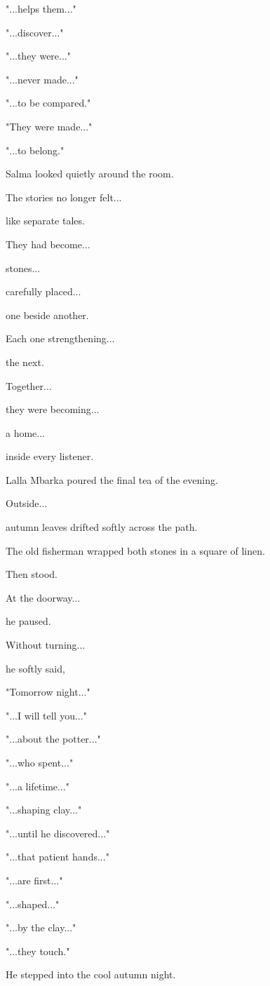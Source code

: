 \documentclass[12pt,openany]{book}
\begin{document}
"...helps them..."

"...discover..."

"...they were..."

"...never made..."

"...to be compared."

"They were made..."

"...to belong."

Salma looked quietly around the room.

The stories no longer felt...

like separate tales.

They had become...

stones...

carefully placed...

one beside another.

Each one strengthening...

the next.

Together...

they were becoming...

a home...

inside every listener.

Lalla Mbarka poured the final tea of the evening.

Outside...

autumn leaves drifted softly across the path.

The old fisherman wrapped both stones in a square of linen.

Then stood.

At the doorway...

he paused.

Without turning...

he softly said,

"Tomorrow night..."

"...I will tell you..."

"...about the potter..."

"...who spent..."

"...a lifetime..."

"...shaping clay..."

"...until he discovered..."

"...that patient hands..."

"...are first..."

"...shaped..."

"...by the clay..."

"...they touch."

He stepped into the cool autumn night.
\end{document}
